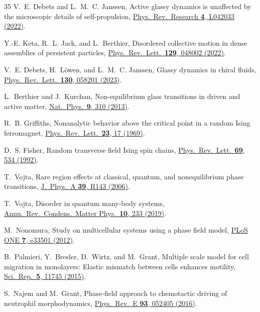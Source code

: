 \documentclass[aps,pre,twocolumn,superscriptaddress,longbibliography,floatfix]{revtex4-2}
\begin{document}
\begin{thebibliography}{35}
V.~E. Debets and L.~M.~C. Janssen,
Active glassy dynamics is unaffected by the microscopic details of
self-propulsion,
\href{https://doi.org/10.1103/PhysRevResearch.4.L042033}{Phys.\ Rev.\ Research \textbf{4}, L042033 (2022)}.

Y.-E. Keta, R.~L. Jack, and L.~Berthier,
Disordered collective motion in dense assemblies of persistent
particles,
\href{https://doi.org/10.1103/PhysRevLett.129.048002}{Phys.\ Rev.\ Lett.\ \textbf{129}, 048002 (2022)}.

V.~E. Debets, H.~L\"owen, and L.~M.~C. Janssen,
Glassy dynamics in chiral fluids,
\href{https://doi.org/10.1103/PhysRevLett.130.058201}{Phys.\ Rev.\ Lett.\ \textbf{130}, 058201 (2023)}.

L.~Berthier and J.~Kurchan,
Non-equilibrium glass transitions in driven and active matter,
\href{https://doi.org/10.1038/nphys2592}{Nat.\ Phys.\ \textbf{9}, 310 (2013)}.

R.~B. Griffiths,
Nonanalytic behavior above the critical point in a random Ising
ferromagnet,
\href{https://doi.org/10.1103/PhysRevLett.23.17}{Phys.\ Rev.\ Lett.\ \textbf{23}, 17 (1969)}.

D.~S. Fisher,
Random transverse field Ising spin chains,
\href{https://doi.org/10.1103/PhysRevLett.69.534}{Phys.\ Rev.\ Lett.\ \textbf{69}, 534 (1992)}.

T.~Vojta,
Rare region effects at classical, quantum, and nonequilibrium phase
transitions,
\href{https://doi.org/10.1088/0305-4470/39/22/R01}{J.\ Phys.\ A \textbf{39}, R143 (2006)}.

T.~Vojta,
Disorder in quantum many-body systems,
\href{https://doi.org/10.1146/annurev-conmatphys-031218-013433}{Annu.\ Rev.\ Condens.\ Matter Phys.\ \textbf{10}, 233 (2019)}.

M.~Nonomura,
Study on multicellular systems using a phase field model,
\href{https://doi.org/10.1371/journal.pone.0033501}{PLoS ONE \textbf{7}, e33501 (2012)}.

B.~Palmieri, Y.~Bresler, D.~Wirtz, and M.~Grant,
Multiple scale model for cell migration in monolayers: Elastic
mismatch between cells enhances motility,
\href{https://doi.org/10.1038/srep11745}{Sci.\ Rep.\ \textbf{5}, 11745 (2015)}.

S.~Najem and M.~Grant,
Phase-field approach to chemotactic driving of neutrophil morphodynamics,
\href{https://doi.org/10.1103/PhysRevE.93.052405}{Phys.\ Rev.\ E \textbf{93}, 052405 (2016)}.


\end{thebibliography}
\end{document}
